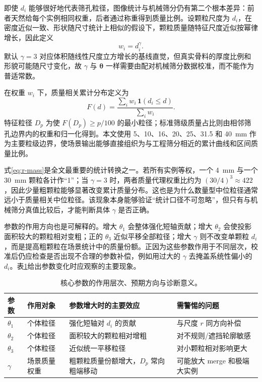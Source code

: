 即使 $d_i$ 能够很好地代表筛孔粒径，图像统计与机械筛分仍有第二个根本差异：前者天然给每个实例相同权重，后者通过称重得到质量比例。设颗粒尺度为 $d_i$，在密度近似一致、形状随尺寸统计上相似的假设下，颗粒质量随特征尺度近似按幂律增长，因此定义
\begin{equation}
 w_i=d_i^{\gamma}.
\label{eq:r-mass}
\end{equation}
默认 $\gamma=3$ 对应体积随线性尺度立方增长的基线直觉，但真实骨料的厚度比例和形貌可能随尺寸变化，故 $\gamma$ 与 $\boldsymbol{\theta}$ 一样需要由配对机械筛分数据校准，而不能作为普适常数。

在权重 $w_i$ 下，质量相关累计分布定义为
\begin{equation}
 F(d)=\frac{\sum_i w_i\,\mathbf{1}(d_i\le d)}{\sum_i w_i}.
\label{eq:r-cdf}
\end{equation}
特征粒径 $D_p$ 为使 $F(D_p)\ge p/100$ 的最小粒径；标准筛级质量占比则由相邻筛孔边界内的权重和归一化得到。本文使用 5、10、16、20、25、31.5 和 40~mm 作为主要粒级边界，使场景输出能够直接组织为与工程筛分相近的累计曲线和区间质量比例。

式\eqref{eq:r-mass}是全文最重要的统计转换之一。若所有实例等权，一个 4~mm 与一个 30~mm 颗粒各计作“1”；当 $\gamma=3$ 时，两者质量代理权重比约为 $(30/4)^3\approx422$，因此少量粗颗粒能够显著改变累计质量分布。这也是为什么数量型中位粒径通常远小于质量相关中位粒径。该现象本身能够验证“统计口径不可忽略”，但只有与机械筛分真值比较后，才能判断具体 $\gamma$ 是否正确。

参数的作用方向也是可解释的。增大 $\theta_1$ 会整体强化短轴贡献；增大 $\theta_2$ 会使投影面积较大的颗粒相对变粗；正的 $\theta_3$ 近似平移全部粒径；增大 $\gamma$ 则不改变单颗粒 $d_i$，而是提高粗颗粒在场景统计中的质量份额。正因为这些参数作用于不同层次，校准后仍应检查是否出现不合理的参数补偿，例如用过大的 $\gamma$ 去掩盖系统性偏小的 $d_i$。表\ref{tab:r-parameter-effects}给出参数变化时应观察的主要现象。

\begin{table}[t]
\centering
\caption{核心参数的作用层次、预期方向与诊断意义。}
\label{tab:r-parameter-effects}
\footnotesize
\renewcommand{\arraystretch}{1.12}
\begin{tabular}{>{\centering\arraybackslash}p{1.6cm}>{\raggedright\arraybackslash}p{3.5cm}>{\raggedright\arraybackslash}p{4.2cm}>{\raggedright\arraybackslash}p{3.9cm}}
\toprule
参数 & 作用对象 & 参数增大时的主要效应 & 需警惕的问题 \\
\midrule
$\theta_1$ & 个体粒径 & 强化短轴对 $d_i$ 的贡献 & 与尺度 $r$ 同方向补偿 \\
$\theta_2$ & 个体粒径 & 面积较大的颗粒相对增粗 & 对不规则/遮挡轮廓敏感 \\
$\theta_3$ & 个体粒径 & 近似统一平移粒径 & 对小颗粒相对影响更大 \\
$\gamma$ & 场景质量权重 & 粗颗粒质量份额增大，$D_p$ 常向粗端移动 & 可能放大 merge 和极端大实例 \\
\bottomrule
\end{tabular}
\end{table}

